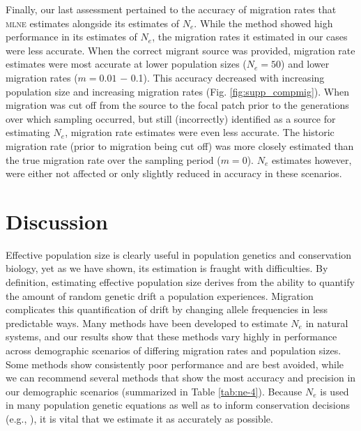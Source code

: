 Finally, our last assessment pertained to the accuracy of migration rates that \textsc{mlne} estimates 
alongside its estimates of $N_e$. While the method showed high performance in its estimates of 
$N_e$, the migration rates it estimated in our cases were less accurate. When the correct migrant 
source was provided, migration rate estimates were most accurate at lower population sizes ($N_e = 50$) 
and lower migration rates ($m = 0.01$ $-$ 0.1). This accuracy decreased with increasing population size 
and increasing migration rates (Fig. \ref{fig:supp_compmig}). When migration was cut off from the source to the focal patch 
prior to the generations over which sampling occurred, but still (incorrectly) identified as a source for 
estimating $N_e$, migration rate estimates were even less accurate. The historic migration rate 
(prior to migration being cut off) was more closely estimated than the true migration rate over the 
sampling period ($m = 0$). $N_e$ estimates however, were either not affected or only slightly 
reduced in accuracy in these scenarios.

\section{Discussion}
Effective population size is clearly useful in population genetics and conservation biology, yet as 
we have shown, its estimation is fraught with difficulties. By definition, estimating effective 
population size derives from the ability to quantify the amount of random genetic drift a population 
experiences. Migration complicates this quantification of drift by changing allele frequencies in 
less predictable ways. Many methods have been developed to estimate $N_e$ in natural 
systems, and our results show that these methods vary highly in performance across demographic scenarios 
of differing migration rates and population sizes. Some methods show consistently poor performance and 
are best avoided, while we can recommend several methods that show the most accuracy and precision in 
our demographic scenarios (summarized in Table \ref{tab:ne-4}). Because $N_e$ is used in many population 
genetic equations as well as to inform conservation decisions (e.g., \citealt{Shaffer:1981, Rieman:2001}), it 
is vital that we estimate it as accurately as possible.

